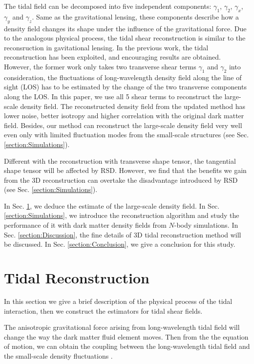 \documentclass[aps,prd,twocolumn,showpacs,superscriptaddress,groupedaddress,nofootinbib]{revtex4}  %
\begin{document}
The tidal field can be decomposed into five independent components: $\gamma_{1}$, $\gamma_{2}$, $\gamma_{x}$, $\gamma_{y}$ and $\gamma_{z}$. Same as the gravitational lensing, these components describe how a density field changes its shape under the influence of the gravitational force. Due to the analogous physical process, the tidal shear reconstruction is similar to the reconsruction in gavitational lensing. In the previous work\cite{2012:pen,2016PhRvD..93j3504Z}, the tidal reconstruction has been exploited, and encouraging results are obtained. However, the former work only takes two transverse shear terms $\gamma_{1}$ and $\gamma_{2}$ into consideration, the fluctuations of long-wavelength density field along the line of sight (LOS) has to be estimated by the change of the two transverse components along the LOS. In this paper, we use all 5 shear terms to reconstruct the large-scale density field. The reconstructed density field from the updated method has lower noise, better isotropy and higher correlation with the original dark matter field. Besides, our method can reconstruct the large-scale density field very well even only with limited fluctuation modes from the small-scale structures (see Sec. \ref{section:Simulations}).

Different with the reconstruction with transverse shape tensor, the tangential shape tensor will be affected by RSD. However, we find that the benefits we gain from the 3D reconstruction can overtake the disadvantage introduced by RSD (see Sec. \ref{section:Simulations}).

In Sec. \ref{section:Tidal Reconstruction}, we deduce the estimate of the large-scale density field. In Sec. \ref{section:Simulations}, we introduce the reconstruction algorithm and study the performance of it with dark matter density fields from $N$-body simulations. In Sec. \ref{section:Discussion}, the fine details of 3D tidal reconstruction method will be discussed. In Sec. \ref{section:Conclusion}, we give a conclusion for this study.

\section{Tidal Reconstruction}\label{section:Tidal Reconstruction}
In this section we give a brief description of the physical process of the tidal interaction, then we construct the estimators for tidal shear fields.

The anisotropic gravitational force arising from long-wavelength tidal field will change the way the dark matter fluid element moves. Then from the the equation of motion, we can obtain the coupling between the long-wavelength tidal field and the small-scale density fluctuations \cite{2016PhRvD..93j3504Z}.
\end{document}
